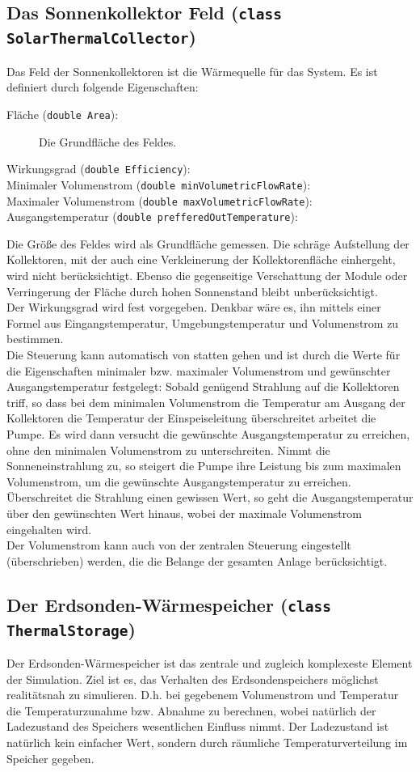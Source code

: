 \documentclass[12pt,a4paper]{article}
\begin{document}
\subsection{Das Sonnenkollektor Feld (\texttt{class SolarThermalCollector})}
Das Feld der Sonnenkollektoren ist die Wärmequelle für das System. Es ist definiert durch folgende Eigenschaften:
\begin{description}
\item[Fläche (\texttt{double Area}):] Die Grundfläche des Feldes. 
\item[Wirkungsgrad (\texttt{double Efficiency}):] 
\item[Minimaler Volumenstrom (\texttt{double minVolumetricFlowRate}):]
\item[Maximaler Volumenstrom (\texttt{double maxVolumetricFlowRate}):]
\item[Ausgangstemperatur (\texttt{double prefferedOutTemperature}):] 
\end{description}
Die Größe des Feldes wird als Grundfläche gemessen. Die schräge Aufstellung der Kollektoren, mit der auch eine Verkleinerung der Kollektorenfläche einhergeht, wird nicht berücksichtigt. Ebenso die gegenseitige Verschattung der Module oder Verringerung der Fläche durch hohen Sonnenstand bleibt unberücksichtigt. \\
Der Wirkungsgrad wird fest vorgegeben. Denkbar wäre es, ihn mittels einer Formel aus Eingangstemperatur, Umgebungstemperatur und Volumenstrom zu bestimmen.\\
Die Steuerung kann automatisch von statten gehen und ist durch die Werte für die Eigenschaften minimaler bzw. maximaler Volumenstrom und gewünschter Ausgangstemperatur festgelegt: Sobald genügend Strahlung auf die Kollektoren triff, so dass bei dem minimalen Volumenstrom die Temperatur am Ausgang der Kollektoren die Temperatur der Einspeiseleitung überschreitet arbeitet die Pumpe. Es wird dann versucht die gewünschte Ausgangstemperatur zu erreichen, ohne den minimalen Volumenstrom zu unterschreiten. Nimmt die Sonneneinstrahlung zu, so steigert die Pumpe ihre Leistung bis zum maximalen Volumenstrom, um die gewünschte Ausgangstemperatur zu erreichen. Überschreitet die Strahlung einen gewissen Wert, so geht die Ausgangstemperatur über den gewünschten Wert hinaus, wobei der maximale Volumenstrom eingehalten wird.\\
Der Volumenstrom kann auch von der zentralen Steuerung eingestellt (überschrieben) werden, die die Belange der gesamten Anlage berücksichtigt.

\subsection{Der Erdsonden-Wärmespeicher (\texttt{class ThermalStorage})}
Der Erdsonden-Wärmespeicher ist das zentrale und zugleich komplexeste Element der Simulation. Ziel ist es, das Verhalten des Erdsondenspeichers möglichst realitätsnah zu simulieren. D.h. bei gegebenem Volumenstrom und Temperatur die Temperaturzunahme bzw. Abnahme zu berechnen, wobei natürlich der Ladezustand des Speichers wesentlichen Einfluss nimmt. Der Ladezustand ist natürlich kein einfacher Wert, sondern durch räumliche Temperaturverteilung im Speicher gegeben.
\end{document}
